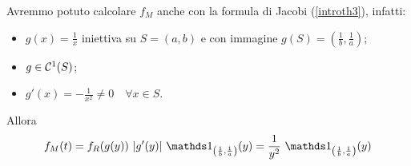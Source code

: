 \begin{enumerate}
\begin{rem} Avremmo potuto calcolare $f_M$ anche con la formula di Jacobi (\ref{introth3}), infatti:
\begin{itemize}
\item $g(x)=\frac{1}{x}$ iniettiva su $S=(a,b)$ e con immagine $g(S)=\left(\frac{1}{b},\frac{1}{a}\right)$;
\item $g\in\mathcal{C}^1(S)$;
\item $g'(x)=-\frac{1}{x^2}\neq 0\quad \forall x\in S$.
\end{itemize}
Allora
\[
f_M(t)=f_R(g(y))\ |g'(y)|\ \Ind_{\left(\frac{1}{b},\frac{1}{a}\right)}(y)=\frac{1}{y^2}\ \Ind_{\left(\frac{1}{b},\frac{1}{a}\right)}(y)
\]
\end{rem}

\end{enumerate}

